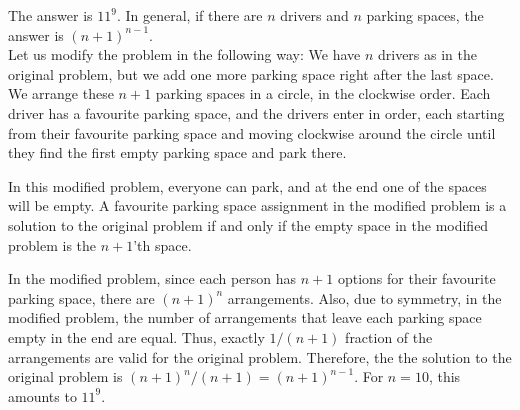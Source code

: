 \begin{solution}
The answer is $11^9$. In general, if there are $n$ drivers and $n$ parking spaces, the answer is $(n+1)^{n-1}$.\\[0.2cm]

Let us modify the problem in the following way: We have $n$ drivers as in the original problem, but we add one more parking space right after the last space. We arrange these $n+1$ parking spaces in a circle, in the clockwise order. Each driver has a favourite parking space, and the drivers enter in order, each starting from their favourite parking space and moving clockwise around the circle until they find the first empty parking space and park there.

In this modified problem, everyone can park, and at the end one of the spaces will be empty. A favourite parking space assignment in the modified problem is a solution to the original problem if and only if the empty space in the modified problem is the $n+1$'th space.

In the modified problem, since each person has $n+1$ options for their favourite parking space, there are $(n+1)^n$ arrangements. Also, due to symmetry, in the modified problem, the number of arrangements that leave each parking space empty in the end are equal. Thus, exactly $1/(n+1)$ fraction of the arrangements are valid for the original problem. Therefore, the the solution to the original problem is  $(n+1)^n/(n+1) = (n+1)^{n-1}$. For $n=10$, this amounts to $11^9$.
\end{solution}
